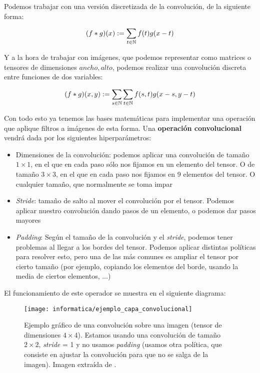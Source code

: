 Podemos trabajar con una versión discretizada de la convolución, de la siguiente forma:

\begin{equation}
    (f * g)(x) := \sum_{t \in \mathbb{N}} f(t) g(x - t)
\end{equation}

Y a la hora de trabajar con imágenes, que podemos representar como matrices o tensores de dimensiones $ancho, alto$, podemos realizar una convolución discreta entre funciones de dos variables:

\begin{equation}
    (f * g)(x, y) := \sum_{s \in \mathbb{N}} \sum_{t \in \mathbb{N}} f(s, t) g(x - s, y - t)
\end{equation}

Con todo esto ya tenemos las bases matemáticas para implementar una operación que aplique filtros a imágenes de esta forma. Una \textbf{operación convolucional} vendrá dada por los siguientes hiperparámetros:

\begin{itemize}
    \item Dimensiones de la convolución: podemos aplicar una convolución de tamaño $1 \times 1$, en el que en cada paso sólo nos fijamos en un elemento del tensor. O de tamaño $3 \times 3$, en el que en cada paso nos fijamos en 9 elementos del tensor. O cualquier tamaño, que normalmente se toma impar
    \item \textit{Stride}: tamaño de salto al mover el convolución por el tensor. Podemos aplicar nuestro convolución dando pasos de un elemento, o podemos dar pasos mayores
    \item \textit{Padding}: Según el tamaño de la convolución y el \textit{stride}, podemos tener problemas al llegar a los bordes del tensor. Podemos aplicar distintas políticas para resolver esto, pero una de las más comunes es ampliar el tensor por cierto tamaño (por ejemplo, copiando los elementos del borde, usando la media de ciertos elementos, ...)
\end{itemize}

El funcionamiento de este operador se muestra en el siguiente diagrama:

\begin{figure}[H]
    \centering
    \texttt{[image: informatica/ejemplo\_capa\_convolucional]}
    \caption{Ejemplo gráfico de una convolución sobre una imagen (tensor de dimensiones $4 \times 4$). Estamos usando una convolución de tamaño $2 \times 2$, \textit{stride} = 1 y no usamos \textit{padding} (usamos otra política, que consiste en ajustar la convolución para que no se salga de la imagen). Imagen extraída de \cite{informatica:paper_definicion_cnn}.}
\end{figure}

